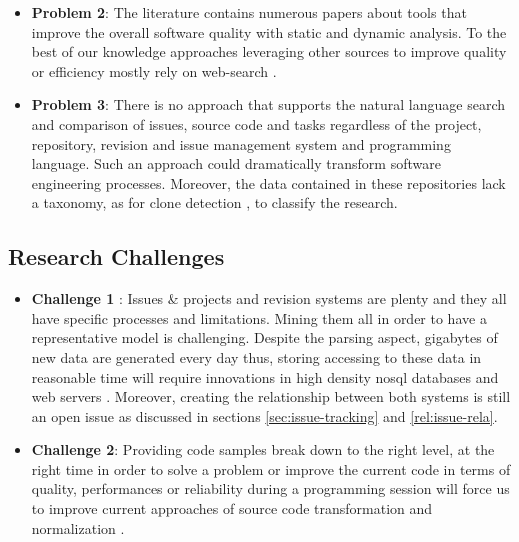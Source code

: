 \begin{itemize}
	\item {\bf Problem 2}: The literature contains numerous papers about tools that improve the overall software quality with static \cite{Dangel2000, burn2003checkstyle, Hovemeyer2007, Moha2010} and dynamic \cite{Nayrolles,Nayrolles2013a,Palma2013} analysis. To the best of our knowledge approaches leveraging other sources to improve quality or efficiency mostly rely on web-search \cite{Brandt2009,Rahman2013,Montandon2013}.

	\item {\bf Problem 3}: There is no approach that supports the natural language search and comparison of issues, source code and tasks regardless of the project, repository, revision and issue management system and programming language. Such an approach could dramatically transform software engineering processes. Moreover, the data contained in these repositories lack a taxonomy, as for clone detection \cite{CoryKapser}, to classify the research.
\end{itemize}

\subsection{Research Challenges\label{sec:challenges}}

\begin{itemize}
	\item {\bf Challenge 1} : Issues \& projects and revision systems are plenty and they all have specific processes and limitations. Mining them all in order to have a representative model is challenging. Despite the parsing aspect, gigabytes of new data are generated every day thus, storing accessing to these data in reasonable time will require innovations in high density nosql databases \cite{Nayrolles2014b} and web servers \cite{Nayrolles2013b,Nayrolles2014c}. Moreover, creating the relationship between both systems is still an open issue as discussed in sections \ref{sec:issue-tracking} and \ref{rel:issue-rela}.

	\item {\bf Challenge 2}: Providing code samples break down to the right level, at the right time in order to solve a problem  or improve the current code in terms of quality, performances or reliability during a programming session will force us to improve current approaches of source code transformation and normalization \cite{Cordy2006a, Cordy2006, Roy2008, Cordy2011}.
\end{itemize}

